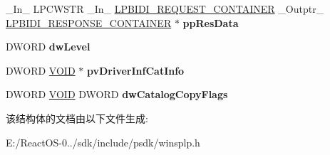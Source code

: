 \begin{DoxyCompactItemize}
\item 
\mbox{\label{struct___p_r_i_n_t_p_r_o_v_i_d_o_r_afca297583c1381c437f9d9e1d6d57b9f}} 
\+\_\+\+In\+\_\+ L\+P\+C\+W\+S\+TR \+\_\+\+In\+\_\+ \hyperlink{struct___b_i_d_i___r_e_q_u_e_s_t___c_o_n_t_a_i_n_e_r}{L\+P\+B\+I\+D\+I\+\_\+\+R\+E\+Q\+U\+E\+S\+T\+\_\+\+C\+O\+N\+T\+A\+I\+N\+ER} \+\_\+\+Outptr\+\_\+ \hyperlink{struct___b_i_d_i___r_e_s_p_o_n_s_e___c_o_n_t_a_i_n_e_r}{L\+P\+B\+I\+D\+I\+\_\+\+R\+E\+S\+P\+O\+N\+S\+E\+\_\+\+C\+O\+N\+T\+A\+I\+N\+ER} $\ast$ {\bfseries pp\+Res\+Data}
\item 
\mbox{\label{struct___p_r_i_n_t_p_r_o_v_i_d_o_r_af59ac4be5c8ecd65252f187245da5644}} 
D\+W\+O\+RD {\bfseries dw\+Level}
\item 
\mbox{\label{struct___p_r_i_n_t_p_r_o_v_i_d_o_r_ac5bc4db6a7b9dd16eef08e9317bfabb9}} 
D\+W\+O\+RD \hyperlink{interfacevoid}{V\+O\+ID} $\ast$ {\bfseries pv\+Driver\+Inf\+Cat\+Info}
\item 
\mbox{\label{struct___p_r_i_n_t_p_r_o_v_i_d_o_r_aea5eb954bfcf5965c46fedab07741e0e}} 
D\+W\+O\+RD \hyperlink{interfacevoid}{V\+O\+ID} D\+W\+O\+RD {\bfseries dw\+Catalog\+Copy\+Flags}
\end{DoxyCompactItemize}


该结构体的文档由以下文件生成\+:\begin{DoxyCompactItemize}
\item 
E\+:/\+React\+O\+S-\/0../sdk/include/psdk/winsplp.\+h\end{DoxyCompactItemize}
